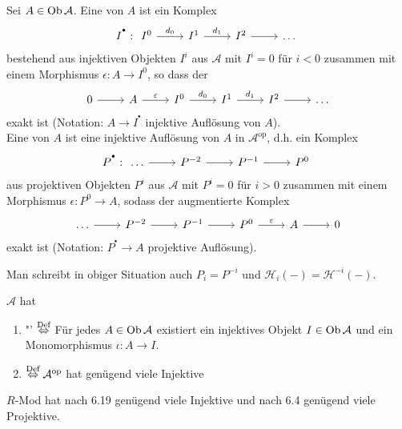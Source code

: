 \begin{df}\label{7.5}
	Sei $A\in \text{Ob}\,\mathcal{A}$. Eine  von $A$ ist ein Komplex 
	$$I^{^\bullet}: \begin{tikzcd}
	I^0\arrow{r}{d_0} & I^1 \arrow{r}{d_1}& I^2\arrow{r} & \ldots
	\end{tikzcd}$$
	bestehend aus injektiven Objekten $I^i$ aus $\mathcal{A}$ mit $I^i=0$ für $i<0$ zusammen mit einem Morphismus $\epsilon : A\longrightarrow I^0$, so dass der 
	$$\begin{tikzcd}
	0 \arrow{r}& A \arrow{r}{\epsilon} &I^0\arrow{r}{d_0} & I^1 \arrow{r}{d_1}& I^2\arrow{r} & \ldots
	\end{tikzcd}$$
	exakt ist (Notation: $A\longrightarrow I^{^\bullet}$ injektive Auflösung von $A$).\\
	Eine  von $A$ ist eine injektive Auflösung von $A$ in $\mathcal{A}^\text{op}$, d.h. ein Komplex 
	$$P^{^\bullet}: \begin{tikzcd}
	\ldots \arrow{r} &P^{-2} \arrow{r} & P^{-1} \arrow{r} & P^0
	\end{tikzcd}$$
	aus projektiven Objekten $P^i$ aus $\mathcal{A}$ mit $P^i=0$ für $i>0$ zusammen mit einem Morphismus $\epsilon:P^0 \to A$, sodass der augmentierte Komplex
	$$\begin{tikzcd}
	\ldots \arrow{r} & P^{-2} \arrow{r} &P^{-1} \arrow{r} & P^0 \arrow{r}{\epsilon} & A \arrow{r} & 0
		\end{tikzcd}$$
	exakt ist (Notation: $P^{^\bullet} \longrightarrow A$ projektive Auflösung).
\end{df}
\begin{anm}
	Man schreibt in obiger Situation auch $P_i = P^{-i}$ und $\mathcal{H}_i(-) = \mathcal{H}^{-i}(-)$.
\end{anm}
\begin{df}\label{7.7}
	$\mathcal{A}$ hat
	\begin{enumerate}
		\item[] "' $\overset{\text{Def}}{\Leftrightarrow}$ Für jedes $A\in \text{Ob}\,\mathcal{A}$ existiert ein injektives Objekt $I\in \text{Ob}\,\mathcal{A}$ und ein Monomorphismus $\iota:A \to I$.
		\item[]   $\overset{\text{Def}}{\Leftrightarrow} \mathcal{A}^\text{op}$ hat genügend viele Injektive
	\end{enumerate}
\end{df}
\begin{bsp}
	$R$-Mod hat nach 6.19 genügend viele Injektive und nach 6.4 genügend viele Projektive.
\end{bsp}
